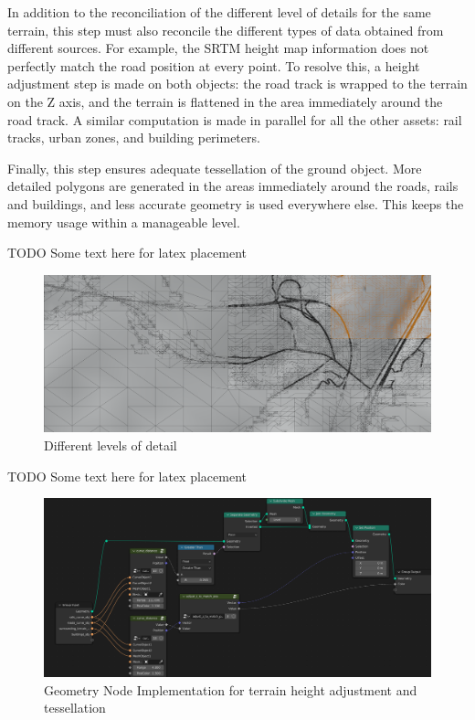 In addition to the reconciliation of the different level of details for the same terrain, this step must also reconcile the different types of data obtained from different sources. For example, the SRTM height map information does not perfectly match the road position at every point. To resolve this, a height adjustment step is made on both objects: the road track is wrapped to the terrain on the Z axis, and the terrain is flattened in the area immediately around the road track. A similar computation is made in parallel for all the other assets: rail tracks, urban zones, and building perimeters.

Finally, this step ensures adequate tessellation of the ground object. More detailed polygons are generated in the areas immediately around the roads, rails and buildings, and less accurate geometry is used everywhere else. This keeps the memory usage within a manageable level.

TODO Some text here for latex placement

\begin{figure}[H]
    \centering
    \includegraphics[width=14.5cm]{src/img/pic/pic-1 blender screenshot sat levels of detail.png}
    \caption{Different levels of detail }
    \label{fig:impl-levels-of-detail}
\end{figure}

TODO Some text here for latex placement

\begin{figure}[H]
    \centering
    \includegraphics[width=14.5cm]{src/img/pic/pic-2 screenshot of blender adjust terrain geometry node.png}
    \caption{Geometry Node Implementation for terrain height adjustment and tessellation}
    \label{fig:impl-geom-nodes-terrain}
\end{figure}


